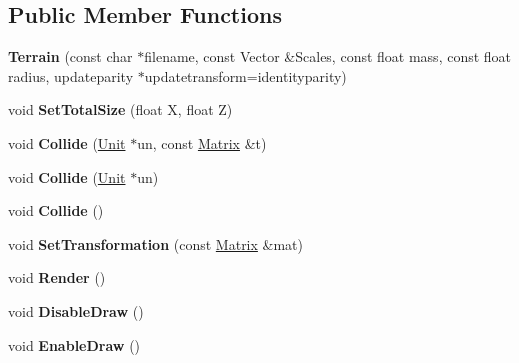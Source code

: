 \subsection*{Public Member Functions}
\begin{DoxyCompactItemize}
\item 
{\bfseries Terrain} (const char $\ast$filename, const Vector \&Scales, const float mass, const float radius, updateparity $\ast$updatetransform=identityparity)\hypertarget{classTerrain_a295071e70e6e0b46fbf3ba37ea9a6bd4}{}\label{classTerrain_a295071e70e6e0b46fbf3ba37ea9a6bd4}

\item 
void {\bfseries Set\+Total\+Size} (float X, float Z)\hypertarget{classTerrain_a2870b4596d416d5133e5220f53ce6610}{}\label{classTerrain_a2870b4596d416d5133e5220f53ce6610}

\item 
void {\bfseries Collide} (\hyperlink{classUnit}{Unit} $\ast$un, const \hyperlink{classMatrix}{Matrix} \&t)\hypertarget{classTerrain_a246f2e1a6e7dcda369f622ea11f3d297}{}\label{classTerrain_a246f2e1a6e7dcda369f622ea11f3d297}

\item 
void {\bfseries Collide} (\hyperlink{classUnit}{Unit} $\ast$un)\hypertarget{classTerrain_a2c0971bce0b488c9587cc0ce48eebbd5}{}\label{classTerrain_a2c0971bce0b488c9587cc0ce48eebbd5}

\item 
void {\bfseries Collide} ()\hypertarget{classTerrain_adcc0d4e3a0aecde59c314db93dd9efc5}{}\label{classTerrain_adcc0d4e3a0aecde59c314db93dd9efc5}

\item 
void {\bfseries Set\+Transformation} (const \hyperlink{classMatrix}{Matrix} \&mat)\hypertarget{classTerrain_ae5dd08db4b644b3667c2cf3bca498af2}{}\label{classTerrain_ae5dd08db4b644b3667c2cf3bca498af2}

\item 
void {\bfseries Render} ()\hypertarget{classTerrain_ae41308a381469f114fb09bf7ce8b5cc2}{}\label{classTerrain_ae41308a381469f114fb09bf7ce8b5cc2}

\item 
void {\bfseries Disable\+Draw} ()\hypertarget{classTerrain_a5efdf3a148d36a407f218ee4ef4bd0f2}{}\label{classTerrain_a5efdf3a148d36a407f218ee4ef4bd0f2}

\item 
void {\bfseries Enable\+Draw} ()\hypertarget{classTerrain_a9cf60bdefb30d31f8c35e805ac660cb4}{}\label{classTerrain_a9cf60bdefb30d31f8c35e805ac660cb4}


\end{DoxyCompactItemize}
